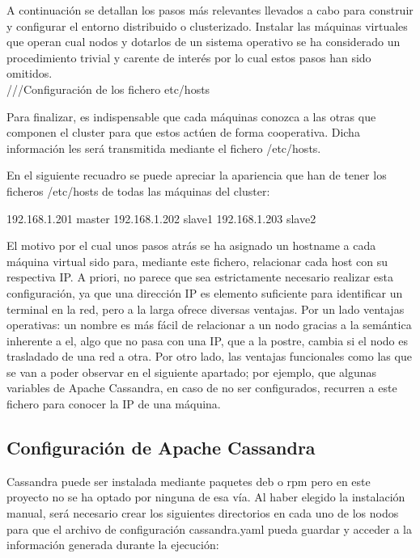 A continuación se detallan los pasos más relevantes llevados a cabo para construir y configurar el entorno distribuido o clusterizado. Instalar las máquinas virtuales que operan cual nodos y dotarlos de un sistema operativo se ha considerado un procedimiento trivial y carente de interés por lo cual estos pasos han sido omitidos.\\ 



///Configuración de los fichero etc/hosts

Para finalizar, es indispensable que cada máquinas conozca a las otras que componen el cluster para que estos actúen de forma  cooperativa. Dicha información les será transmitida mediante el fichero /etc/hosts.

En el siguiente recuadro se puede apreciar la apariencia que han de tener los ficheros /etc/hosts de todas las máquinas del cluster:

192.168.1.201 master
192.168.1.202 slave1
192.168.1.203 slave2

El motivo por el cual unos pasos atrás se ha asignado un hostname a cada máquina virtual sido para, mediante este fichero, relacionar cada host con su respectiva IP. A priori, no parece que sea estrictamente necesario realizar esta configuración, ya que una dirección IP es elemento suficiente para identificar un terminal en la red, pero a la larga ofrece diversas ventajas. Por un lado  ventajas operativas: un nombre es más fácil de relacionar a un nodo gracias a la semántica inherente a el, algo que no pasa con una IP, que a la postre, cambia si el nodo es trasladado de una red a otra. Por otro lado, las ventajas funcionales como las que se van a poder observar en el siguiente apartado; por ejemplo, que algunas variables de Apache Cassandra, en caso de no ser configurados, recurren a este fichero para conocer la IP de una máquina. 

\subsection{Configuración de Apache Cassandra}

Cassandra puede ser instalada mediante paquetes deb o rpm pero en este proyecto no se ha optado por ninguna de esa vía. Al haber elegido la instalación manual, será necesario crear los siguientes directorios en cada uno de los nodos para que el archivo de configuración cassandra.yaml pueda guardar y acceder a la información generada durante la ejecución:


